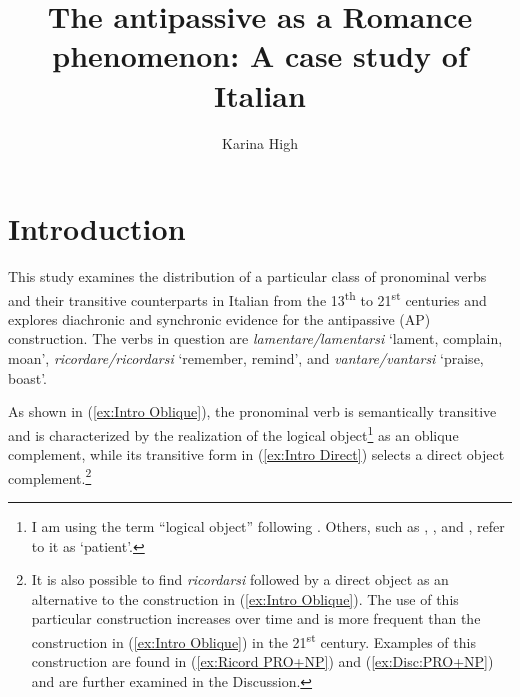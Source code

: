 \documentclass[output=paper,colorlinks,citecolor=brown]{langscibook}
\author{Karina High \affiliation{University of Texas at Austin}}
\title{The antipassive as a Romance phenomenon: A case study of Italian}
\begin{document}
\maketitle

\section{Introduction}
This study examines the distribution of a particular class of pronominal verbs and their transitive counterparts in Italian from the 13\textsuperscript{th} to 21\textsuperscript{st} centuries and explores diachronic and synchronic evidence for the antipassive (AP) construction. The verbs in question are \textit{lamentare/lamentarsi} ‘lament, complain, moan’, \textit{ricordare/ricordarsi} ‘remember, remind’, and \textit{vantare/vantarsi} ‘praise, boast’.

\newpage

As shown in (\ref{ex:Intro Oblique}), the pronominal verb is semantically transitive and is characterized by the realization of the logical object\footnote{I am using the term ``logical object'' following \citet{polinsky_13._2017}. Others, such as \citet{creissels_origin_2012}, \citet{janic_slavonic_2013}, and \citet{sanso_where_2017, sanso_sources_2019}, refer to it as `patient'.} as an oblique complement, while its transitive form in (\ref{ex:Intro Direct}) selects a direct object complement.\footnote{It is also possible to find \textit{ricordarsi} followed by a direct object as an alternative to the construction in (\ref{ex:Intro Oblique}). The use of this particular construction increases over time and is more frequent than the construction in (\ref{ex:Intro Oblique}) in the 21\textsuperscript{st} century. Examples of this construction are found in (\ref{ex:Ricord PRO+NP}) and (\ref{ex:Disc:PRO+NP}) and are further examined in the Discussion.}
\end{document}
